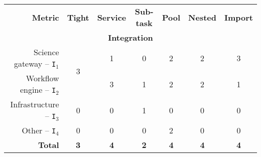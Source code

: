 \documentclass[preprint,3p,twocolumn]{elsarticle}
\begin{document}
\begin{table*}
\centering
\begin{tabular}{rcccccc}
\textbf{Metric}                      & \textbf{Tight}
                                     & \textbf{Service}
                                     & \textbf{Sub-task}
                                     & \textbf{Pool}
                                     & \textbf{Nested}
                                     & \textbf{Import} \\
\multicolumn{7}{c}{\cellcolor[HTML]{EEEEEE}\textbf{Integration}}\\
Science gateway -- \texttt{I$_1$}    & \multirow{2}{*}{3}
                                     & \cellcolor[HTML]{99FF99}1
                                     & \cellcolor[HTML]{99FF99}0  
                                     & \cellcolor[HTML]{99FF99}2
                                     & \cellcolor[HTML]{99FF99}2
                                     & \cellcolor[HTML]{99AA99}3 \\
Workflow engine -- \texttt{I$_2$}    &
                                     & \cellcolor[HTML]{99FF99}3 
                                     & \cellcolor[HTML]{99FF99}1
                                     & \cellcolor[HTML]{99AA99}2
                                     & \cellcolor[HTML]{99AA99}2
                                     & \cellcolor[HTML]{99FF99}1 \\
Infrastructure -- \texttt{I$_3$}   & \cellcolor[HTML]{99FF99}0
                                     & \cellcolor[HTML]{99FF99}0
                                     & \cellcolor[HTML]{99FF99}1
                                     & \cellcolor[HTML]{99AA99}0
                                     & \cellcolor[HTML]{99AA99}0
                                     & \cellcolor[HTML]{99FF99}0 \\
Other -- \texttt{I$_4$}              & \cellcolor[HTML]{99FF99}0
                                     & \cellcolor[HTML]{99FF99}0
                                     & \cellcolor[HTML]{99FF99}0
                                     & \cellcolor[HTML]{99AA99}2
                                     & \cellcolor[HTML]{99AA99}0
                                     & \cellcolor[HTML]{99FF99}0 \\
\textbf{Total}                       & \cellcolor[HTML]{99FF99}\textbf{3}
                                     & \cellcolor[HTML]{99FF99}\textbf{4}
                                     & \cellcolor[HTML]{99FF99}\textbf{2}
                                     & \cellcolor[HTML]{99AA99}\textbf{4}
                                     & \cellcolor[HTML]{99AA99}\textbf{4}
                                     & \cellcolor[HTML]{99AA99}\textbf{4} \\


\end{tabular}
\end{table*}
\end{document}
